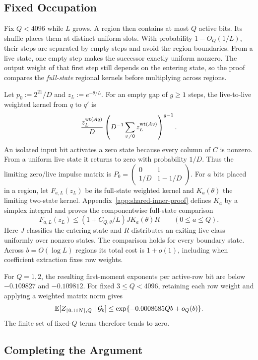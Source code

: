 \subsection{Fixed Occupation}

Fix $Q<4096$ while $L$ grows. A region then contains at most $Q$
active bits. Its shuffle places them at distinct uniform slots.
With probability $1-O_Q(1/L)$, their steps are separated by empty
steps and avoid the region boundaries. From a live state, one empty
step makes the successor exactly uniform nonzero. The output weight
of that first step still depends on the entering state, so the proof
compares the \emph{full-state} regional kernels before multiplying
across regions.

Let $p_0:=2^{21}/D$ and $z_L:=e^{-\theta/L}$. For an empty gap of
$g\ge1$ steps, the live-to-live weighted kernel from $q$ to $q'$ is
\[
 \frac{z_L^{\operatorname{wt}(Aq)}}{D}
 \left(D^{-1}\sum_{v\ne0}z_L^{\operatorname{wt}(Av)}\right)^{g-1}.
\]
An isolated input bit activates a zero state because every column of
$C$ is nonzero. From a uniform live state it returns to zero with
probability $1/D$. Thus the limiting zero/live impulse matrix is
$P_0=\left(\begin{smallmatrix}0&1\\1/D&1-1/D\end{smallmatrix}\right)$.
For $a$ bits placed in a region, let $F_{a,L}(z_L)$ be its full-state
weighted kernel and $K_a(\theta)$ the limiting two-state kernel.
Appendix~\ref{app:shared-inner-proof}
defines $K_a$ by a simplex integral and proves the componentwise
full-state comparison
\[
 F_{a,L}(z_L)\le(1+C_{Q,\theta}/L)J K_a(\theta)R
 \qquad(0\le a\le Q).
\]
Here $J$ classifies the entering state and $R$ distributes an exiting
live class uniformly over nonzero states. The comparison holds for
every boundary state. Across $b=O(\log L)$ regions its total cost is
$1+o(1)$, including when coefficient extraction fixes row weights.

For $Q=1,2$, the resulting first-moment exponents per active-row bit
are below $-0.109827$ and $-0.109812$. For fixed $3\le Q<4096$,
retaining each row weight and applying a weighted matrix norm gives
\[
 \mathbb E[Z_{\lfloor0.11N\rfloor,Q}\mid\mathcal G_b]
 \le\exp\{-0.0008685Qb+o_Q(b)\}.
\]
The finite set of fixed-$Q$ terms therefore tends to zero.

\subsection{Completing the Argument}

